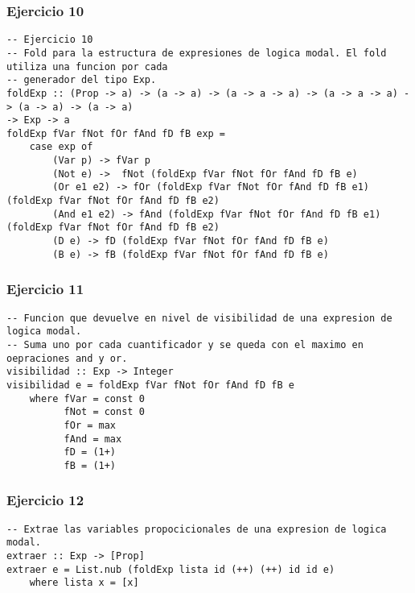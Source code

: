 \vspace{1cm}

\subsubsection*{Ejercicio 10}
\begin{lstlisting}
-- Ejercicio 10
-- Fold para la estructura de expresiones de logica modal. El fold utiliza una funcion por cada
-- generador del tipo Exp.
foldExp :: (Prop -> a) -> (a -> a) -> (a -> a -> a) -> (a -> a -> a) -> (a -> a) -> (a -> a) 
-> Exp -> a
foldExp fVar fNot fOr fAnd fD fB exp =
	case exp of
		(Var p) -> fVar p
		(Not e) ->  fNot (foldExp fVar fNot fOr fAnd fD fB e)
		(Or e1 e2) -> fOr (foldExp fVar fNot fOr fAnd fD fB e1) (foldExp fVar fNot fOr fAnd fD fB e2)
		(And e1 e2) -> fAnd (foldExp fVar fNot fOr fAnd fD fB e1) (foldExp fVar fNot fOr fAnd fD fB e2)
		(D e) -> fD (foldExp fVar fNot fOr fAnd fD fB e)
		(B e) -> fB (foldExp fVar fNot fOr fAnd fD fB e)
\end{lstlisting}
\vspace{1cm}


\subsubsection*{Ejercicio 11}
\begin{lstlisting}
-- Funcion que devuelve en nivel de visibilidad de una expresion de logica modal.
-- Suma uno por cada cuantificador y se queda con el maximo en oepraciones and y or.
visibilidad :: Exp -> Integer
visibilidad e = foldExp fVar fNot fOr fAnd fD fB e
    where fVar = const 0
          fNot = const 0 
          fOr = max
          fAnd = max
          fD = (1+)
          fB = (1+)	
\end{lstlisting}
\vspace{1cm}

\subsubsection*{Ejercicio 12}
\begin{lstlisting}
-- Extrae las variables propocicionales de una expresion de logica modal.
extraer :: Exp -> [Prop]
extraer e = List.nub (foldExp lista id (++) (++) id id e)
	where lista x = [x]
\end{lstlisting}
\vspace{1cm}

